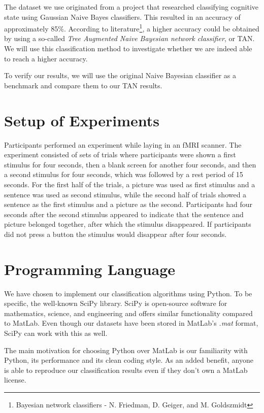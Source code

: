 \documentclass[a4paper, 11pt]{scrartcl}
\begin{document}
The dataset we use originated from a project that researched classifying cognitive state using Gaussian Naive Bayes classifiers. This resulted in an accuracy of approximately 85\%. According to literature\footnote{Bayesian network classifiers - N. Friedman, D. Geiger, and M. Goldszmidt}, a higher accuracy could be obtained by using a so-called \textit{Tree Augmented Naive Bayesian network classifier}, or TAN. We will use this classification method to investigate whether we are indeed able to reach a higher accuracy.

To verify our results, we will use the original Naive Bayesian classifier as a benchmark and compare them to our TAN results.

\section{Setup of Experiments}
\label{sec:setup}

Participants performed an experiment while laying in an fMRI scanner. The experiment consisted of sets of trials where participants were shown a first stimulus for four seconds, then a blank screen for another four seconds, and then a second stimulus for four seconds, which was followed by a rest period of 15 seconds. For the first half of the trials, a picture was used as first stimulus and a sentence was used as second stimulus, while the second half of trials showed a sentence as the first stimulus and a picture as the second. Participants had four seconds after the second stimulus appeared to indicate that the sentence and picture belonged together, after which the stimulus disappeared. If participants did not press a button the stimulus would disappear after four seconds.

\section{Programming Language}
\label{sec:language}

We have chosen to implement our classification algorithms using Python. To be specific,  the well-known SciPy library. SciPy is open-source software for mathematics, science, and engineering and offers similar functionality compared to MatLab. Even though our datasets have been stored in MatLab's \textit{.mat} format, SciPy can work with this as well.

The main motivation for choosing Python over MatLab is our familiarity with Python, its performance and its clean coding style. As an added benefit, anyone is able to reproduce our classification results even if they don't own a MatLab license. 
\end{document}
